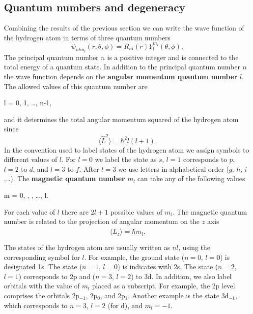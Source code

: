 \documentclass[../Main/chem331-notes.tex]{subfiles}
\begin{document}
\subsection{Quantum numbers and degeneracy}
Combining the results of the previous section we can write the wave function of the hydrogen atom in terms of three quantum numbers
\begin{equation}
\psi_{nlm_l}(r,\theta,\phi) = R_{nl}(r) Y_l^{m_l}(\theta,\phi),
\end{equation}
The principal quantum number $n$ is a positive integer and is connected to the total energy of a quantum state. 
In addition to the principal quantum number $n$ the wave function depends on the \textbf{angular momentum quantum number} $l$.  The allowed values of this quantum number are
\begin{iequation}
l = 0, 1, \ldots, n-1,
\end{iequation}
and it determines the total angular momentum squared of the hydrogen atom since
\begin{equation}
\langle \hat{L}^2 \rangle = \hbar^2 l(l + 1).
\end{equation}
In the convention used to label states of the hydrogen atom we assign symbols to different values of $l$. For $l = 0$ we label the state as $s$, $l = 1$ corresponds to $p$, $l= 2$ to $d$, and $l = 3$ to $f$. After $l=3$ we use letters in alphabetical order ($g$, $h$, $i$,\ldots).
The \textbf{magnetic quantum number} $m_l$ can take any of the following values
\begin{iequation}
m = 0, , ,  \ldots, l.
\end{iequation}
For each value of $l$ there are $2l +1$ possible values of $m_l$. 
The magnetic quantum number is related to the projection of angular momentum on the $z$ axis
\begin{equation}
\langle \hat{L}_z \rangle = \hbar m_l.
\end{equation}

The states of the hydrogen atom are usually written as $nl$, using the corresponding symbol for $l$.
For example, the ground state ($n=0$, $l=0$) is designated 1s. The state ($n=1$, $l=0$) is indicates with 2s. The state ($n=2$, $l=1$) corresponds to 2p and ($n=3$, $l=2$) to 3d.
In addition, we also label orbitals with the value of $m_l$ placed as a subscript.
For example, the 2p level comprises the orbitals 2p$_{-1}$, 2p$_{0}$, and 2p$_{1}$. Another example is the state 3d$_{-1}$, which corresponds to $n = 3$, $l = 2$ (for d), and $m_l = -1$.
\end{document}
